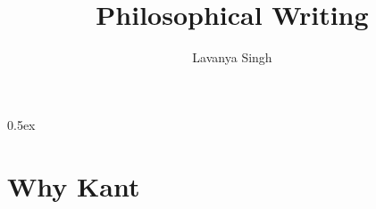 \documentclass[11pt,a4paper]{article}
\begin{document}
\title{Philosophical Writing}
\author{Lavanya Singh}
\maketitle
\tableofcontents


\newpage

\parindent 0pt\parskip 0.5ex


\newpage

\newpage 
\section{Why Kant}

\newpage 



%

\end{document}
